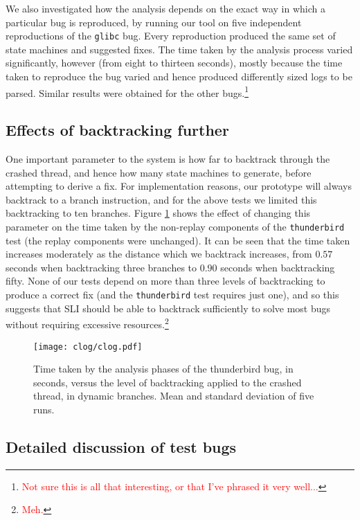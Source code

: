 \documentclass[10pt,twocolumn,preprint,natbib,authoryear]{sigplanconf}
\newcommand{\editorial}[1]{\textcolor{red}{\footnote{\textcolor{red}{#1}}}}
\begin{document}
We also investigated how the analysis depends on the exact way in 
which a particular bug is reproduced, by running our tool
on five independent reproductions of the \verb|glibc| bug.  Every
reproduction produced the same set of state machines and suggested
fixes.  The time taken by the analysis process varied significantly,
however (from eight to thirteen seconds), mostly because the time
taken to reproduce the bug varied and hence produced differently sized
logs to be parsed. Similar results were obtained for the other
bugs.\editorial{Not sure this is all that interesting, or that I've
  phrased it very well...}

\subsection{Effects of backtracking further}
\label{sect:eval:backtrack}

One important parameter to the system is how far to backtrack through
the crashed thread, and hence how many state machines to generate,
before attempting to derive a fix.  For implementation reasons, our
prototype will always backtrack to a branch instruction, and for the
above tests we limited this backtracking to ten branches.  Figure
\ref{fig:eval:backtrack} shows the effect of changing this parameter
on the time taken by the non-replay components of the
\verb|thunderbird| test (the replay components were unchanged).  It
can be seen that the time taken increases moderately as the distance
which we backtrack increases, from $0.57$ seconds when backtracking
three branches to $0.90$ seconds when backtracking fifty.  None of our
tests depend on more than three levels of backtracking to produce a
correct fix (and the \verb|thunderbird| test requires just one), and
so this suggests that SLI should be able to backtrack sufficiently to
solve most bugs without requiring excessive resources.\editorial{Meh.}

\begin{figure}
\texttt{[image: clog/clog.pdf]}
\caption{Time taken by the analysis phases of the thunderbird bug, in
  seconds, versus the level of backtracking applied to the crashed
  thread, in dynamic branches.  Mean and standard deviation of five
  runs.}
\label{fig:eval:backtrack}
\end{figure}


\subsection{Detailed discussion of test bugs}
\label{sect:bug_descr}
\end{document}
